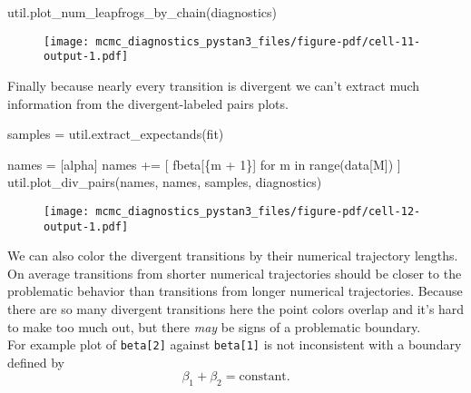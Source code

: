 \documentclass[
  letterpaper,
  DIV=11,
  numbers=noendperiod]{scrartcl}
\newenvironment{Shaded}{\begin{snugshade}}{\end{snugshade}}
\newcommand{\BuiltInTok}[1]{\textcolor[rgb]{0.00,0.23,0.31}{#1}}
\newcommand{\ControlFlowTok}[1]{\textcolor[rgb]{0.00,0.23,0.31}{#1}}
\newcommand{\DecValTok}[1]{\textcolor[rgb]{0.68,0.00,0.00}{#1}}
\newcommand{\KeywordTok}[1]{\textcolor[rgb]{0.00,0.23,0.31}{#1}}
\newcommand{\NormalTok}[1]{\textcolor[rgb]{0.00,0.23,0.31}{#1}}
\newcommand{\OperatorTok}[1]{\textcolor[rgb]{0.37,0.37,0.37}{#1}}
\newcommand{\SpecialCharTok}[1]{\textcolor[rgb]{0.37,0.37,0.37}{#1}}
\newcommand{\SpecialStringTok}[1]{\textcolor[rgb]{0.13,0.47,0.30}{#1}}
\newcommand{\StringTok}[1]{\textcolor[rgb]{0.13,0.47,0.30}{#1}}
\begin{document}
\begin{Shaded}
\begin{Highlighting}[]
\NormalTok{util.plot\_num\_leapfrogs\_by\_chain(diagnostics)}
\end{Highlighting}
\end{Shaded}

\begin{figure}[H]

{\centering \texttt{[image: mcmc\_diagnostics\_pystan3\_files/figure-pdf/cell-11-output-1.pdf]}

}

\end{figure}

Finally because nearly every transition is divergent we can't extract
much information from the divergent-labeled pairs plots.

\begin{Shaded}
\begin{Highlighting}[]
\NormalTok{samples }\OperatorTok{=}\NormalTok{ util.extract\_expectands(fit)}

\NormalTok{names }\OperatorTok{=}\NormalTok{ [}\StringTok{\textquotesingle{}alpha\textquotesingle{}}\NormalTok{]}
\NormalTok{names }\OperatorTok{+=}\NormalTok{ [ }\SpecialStringTok{f\textquotesingle{}beta[}\SpecialCharTok{\{}\NormalTok{m }\OperatorTok{+} \DecValTok{1}\SpecialCharTok{\}}\SpecialStringTok{]\textquotesingle{}} \ControlFlowTok{for}\NormalTok{ m }\KeywordTok{in} \BuiltInTok{range}\NormalTok{(data[}\StringTok{\textquotesingle{}M\textquotesingle{}}\NormalTok{]) ]}
\NormalTok{util.plot\_div\_pairs(names, names, samples, diagnostics)}
\end{Highlighting}
\end{Shaded}

\begin{figure}[H]

{\centering \texttt{[image: mcmc\_diagnostics\_pystan3\_files/figure-pdf/cell-12-output-1.pdf]}

}

\end{figure}

We can also color the divergent transitions by their numerical
trajectory lengths. On average transitions from shorter numerical
trajectories should be closer to the problematic behavior than
transitions from longer numerical trajectories. Because there are so
many divergent transitions here the point colors overlap and it's hard
to make too much out, but there \emph{may} be signs of a problematic
boundary.\\
For example plot of \texttt{beta{[}2{]}} against \texttt{beta{[}1{]}} is
not inconsistent with a boundary defined by \[
\beta_{1} + \beta_{2} = \mathrm{constant}.
\]
\end{document}

